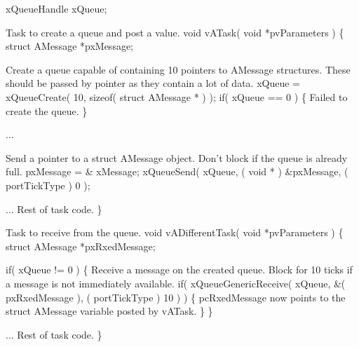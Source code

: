 \begin{DoxyPre} xQueueHandle xQueue;\end{DoxyPre}



\begin{DoxyPre}Task to create a queue and post a value.
 void vATask( void *pvParameters )
 \{
 struct AMessage *pxMessage;\end{DoxyPre}



\begin{DoxyPre}Create a queue capable of containing 10 pointers to AMessage structures.
These should be passed by pointer as they contain a lot of data.
    xQueue = xQueueCreate( 10, sizeof( struct AMessage * ) );
    if( xQueue == 0 )
    \{
Failed to create the queue.
    \}\end{DoxyPre}



\begin{DoxyPre}...\end{DoxyPre}



\begin{DoxyPre}Send a pointer to a struct AMessage object.  Don't block if the
queue is already full.
    pxMessage = \& xMessage;
    xQueueSend( xQueue, ( void * ) \&pxMessage, ( portTickType ) 0 );\end{DoxyPre}



\begin{DoxyPre}... Rest of task code.
 \}\end{DoxyPre}



\begin{DoxyPre}Task to receive from the queue.
 void vADifferentTask( void *pvParameters )
 \{
 struct AMessage *pxRxedMessage;\end{DoxyPre}



\begin{DoxyPre}    if( xQueue != 0 )
    \{
Receive a message on the created queue.  Block for 10 ticks if a
message is not immediately available.
        if( xQueueGenericReceive( xQueue, \&( pxRxedMessage ), ( portTickType ) 10 ) )
        \{
pcRxedMessage now points to the struct AMessage variable posted
by vATask.
        \}
    \}\end{DoxyPre}



\begin{DoxyPre}... Rest of task code.
 \}
 \end{DoxyPre}
 